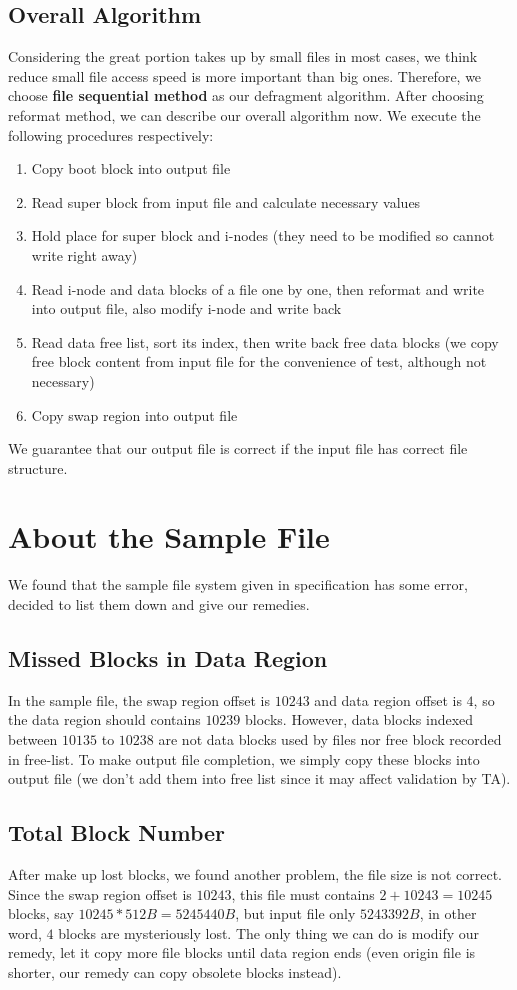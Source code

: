 \documentclass{article}
\begin{document}
\subsection{Overall Algorithm}
Considering the great portion takes up by small files in most cases, we think reduce small file access speed is more important than big ones. Therefore, we choose \textbf{file sequential method} as our defragment algorithm. After choosing reformat method, we can describe our overall algorithm now. We execute the following procedures respectively:
\begin{enumerate}
	\item Copy boot block into output file
	\item Read super block from input file and calculate necessary values
	\item Hold place for super block and i-nodes (they need to be modified so cannot write right away)
	\item Read i-node and data blocks of a file one by one, then reformat and write into output file, also modify i-node and write back
	\item Read data free list, sort its index, then write back free data blocks (we copy free block content from input file for the convenience of test, although not necessary)
	\item Copy swap region into output file
\end{enumerate}
We guarantee that our output file is correct if the input file has correct file structure.

\section{About the Sample File}
We found that the sample file system given in specification has some error, decided to list them down and give our remedies.

\subsection{Missed Blocks in Data Region}
In the sample file, the swap region offset is $10243$ and data region offset is $4$, so the data region should contains $10239$ blocks. However, data blocks indexed between $10135$ to $10238$ are not data blocks used by files nor free block recorded in free-list. To make output file completion, we simply copy these blocks into output file (we don't add them into free list since it may affect validation by TA).

\subsection{Total Block Number}
After make up lost blocks, we found another problem, the file size is not correct. Since the swap region offset is $10243$, this file must contains $2+10243=10245$ blocks, say $10245*512B=5245440B$, but input file only $5243392B$, in other word, $4$ blocks are mysteriously lost. The only thing we can do is modify our remedy, let it copy more file blocks until data region ends (even origin file is shorter, our remedy can copy obsolete blocks instead).
\end{document}
